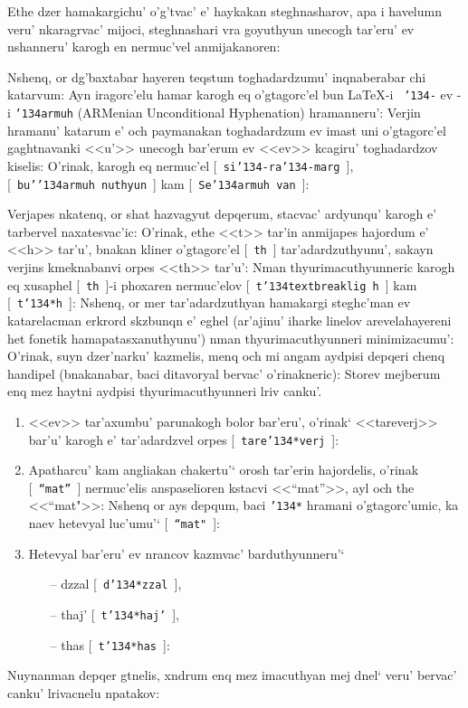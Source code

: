 \documentclass[12pt,a4paper]{article}
\def\mybs{\char'134}
\begin{document}
Ethe dzer hamakargichu' o'g'tvac' e' haykakan steghnasharov, apa i havelumn
veru' nkaragrvac' mijoci, steghnashari vra goyuthyun unecogh tar'eru' ev
nshanneru' karogh en nermuc'vel anmijakanoren:

Nshenq, or dg'baxtabar hayeren teqstum toghadardzumu' inq\-na\-be\-ra\-bar chi
katarvum: Ayn iragorc'elu hamar karogh eq o'gtagorc'el bun {\rm \LaTeX}-i {\tt
  \mybs-} ev \ArmTeX-i {\tt\mybs armuh} ({\aroff ARMenian Unconditional
  Hyphenation}) hramanneru': Verjin hramanu' katarum e' och paymanakan
to\-gha\-dar\-dzum ev imast uni o'gtagorc'el gaghtnavanki <<u'>> unecogh
ba\-r'e\-rum ev <<ev>> kcagiru' toghadardzov kiselis: O'rinak, karogh eq
nermuc'el [~{\tt si\mybs-ra\mybs-marg}~], [~{\tt bu'\mybs armuh\ nuthyun}~]
kam [~{\tt Se\mybs armuh\ van}~]:

Verjapes nkatenq, or shat hazvagyut depqerum, stacvac' ar\-dyun\-qu' karogh e'
tarbervel naxatesvac'ic: O'rinak, ethe <<t>> tar'in anmijapes hajordum e'
<<h>> tar'u', bnakan kliner o'gtagorc'el [~{\tt th}~]
ta\-r'a\-dar\-dzu\-thyu\-nu', sakayn verjins kmeknabanvi orpes <<th>> tar'u':
Nman thyurimacuthyunneric karogh eq xusaphel [~{\tt th}~]-i phoxaren
nermuc'elov [~{\tt t\mybs textbreaklig h}~] kam [~{\tt t\mybs *h}~]: Nshenq,
or mer tar'adardzuthyan ha\-ma\-kar\-gi steghc'man ev katarelacman erkrord
skzbunqn e' eghel (ar'ajinu' iharke linelov arevelahayereni het fonetik
hamapatasxanuthyunu') nman thyurimacuthyunneri minimizacumu': O'rinak, suyn
dzer'narku' kaz\-me\-lis, menq och mi angam aydpisi depqeri chenq handipel
(bnakanabar, baci ditavoryal bervac' o'rinakneric): Storev mejberum enq mez
hayt\-ni aydpisi thyurimacuthyunneri lriv canku'.
\begin{enumerate}
%
\item <<e\*v>> tar'axumbu' parunakogh bolor bar'eru', o'rinak` <<tare\*verj>>
  bar'u' karogh e' tar'adardzvel orpes [~{\tt tare\mybs *verj}~]:
%
\item Apatharcu' kam angliakan chakertu'` orosh tar'erin hajordelis, o'rinak
  [~{\tt ``mat''}~] nermuc'elis anspaselioren kstacvi <<``mat''>>, ayl och the
  <<``mat">>: Nshenq or ays depqum, baci {\tt \mybs *} hramani
  o'g\-ta\-gor\-c'u\-mic, ka naev hetevyal luc'umu'` [~{\tt ``mat"}~]:
%
\item Hetevyal bar'eru' ev nrancov kazmvac' barduthyunneru'`
\begin{itemize}
\item[--]d\*zzal [~{\tt d\mybs *zzal}~],
\item[--]t\*haj' [~{\tt t\mybs *haj'}~],
\item[--]t\*has [~{\tt t\mybs *has}~]:
\end{itemize}
%
\end{enumerate}
Nuynanman depqer gtnelis, xndrum enq mez imacuthyan mej dnel` veru' bervac'
canku' lrivacnelu npatakov:
\end{document}
